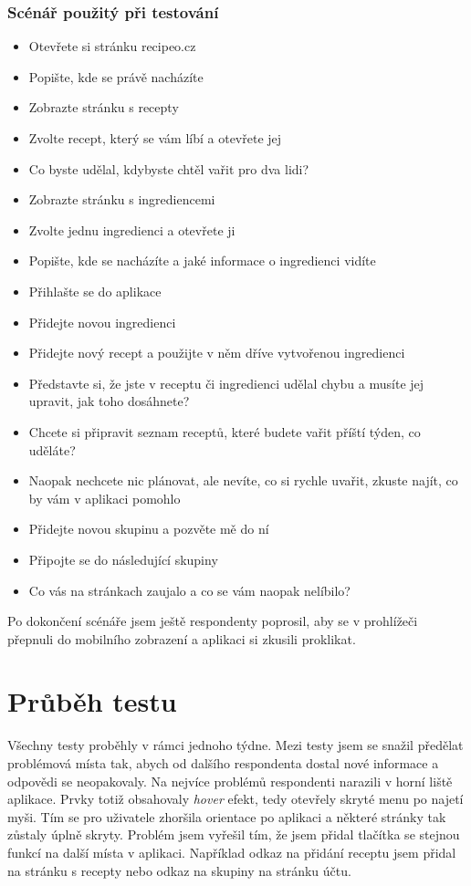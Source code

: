 \subsubsection{Scénář použitý při testování}
\begin{itemize}
    \item Otevřete si stránku recipeo.cz
    \item Popište, kde se právě nacházíte
    \item Zobrazte stránku s recepty
    \item Zvolte recept, který se vám líbí a otevřete jej
    \item Co byste udělal, kdybyste chtěl vařit pro dva lidi?
    \item Zobrazte stránku s ingrediencemi
    \item Zvolte jednu ingredienci a otevřete ji
    \item Popište, kde se nacházíte a jaké informace o ingredienci vidíte
    \item Přihlašte se do aplikace
    \item Přidejte novou ingredienci
    \item Přidejte nový recept a použijte v něm dříve vytvořenou ingredienci
    \item Představte si, že jste v receptu či ingredienci udělal chybu a musíte jej upravit, jak toho dosáhnete?
    \item Chcete si připravit seznam receptů, které budete vařit příští týden, co uděláte?
    \item Naopak nechcete nic plánovat, ale nevíte, co si rychle uvařit, zkuste najít, co by vám v aplikaci pomohlo
    \item Přidejte novou skupinu a pozvěte mě do ní
    \item Připojte se do následující skupiny
    \item Co vás na stránkach zaujalo a co se vám naopak nelíbilo?
\end{itemize}

Po dokončení scénáře jsem ještě respondenty poprosil, aby se v prohlížeči přepnuli do mobilního zobrazení a aplikaci si zkusili proklikat.

\section{Průběh testu}

Všechny testy proběhly v rámci jednoho týdne. Mezi testy jsem se snažil předělat problémová místa tak, abych od dalšího respondenta dostal
nové informace a odpovědi se neopakovaly. Na nejvíce problémů respondenti narazili v horní liště aplikace. Prvky totiž obsahovaly \emph{hover}
efekt, tedy otevřely skryté menu po najetí myši. Tím se pro uživatele zhoršila orientace po aplikaci a některé stránky tak zůstaly úplně skryty.
Problém jsem vyřešil tím, že jsem přidal tlačítka se stejnou funkcí na další místa v aplikaci. Například odkaz na přidání receptu jsem přidal
na stránku s recepty nebo odkaz na skupiny na stránku účtu.

